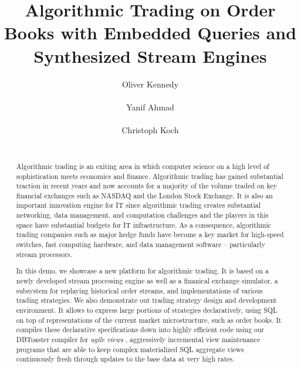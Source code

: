 \documentclass{vldb}
\begin{document}
\title{Algorithmic Trading on Order Books with Embedded Queries and Synthesized
Stream Engines}
\author{
\alignauthor
Oliver Kennedy\\
\\
\alignauthor
Yanif Ahmad\\
\\
\alignauthor
Christoph Koch\\
\\
}
\maketitle

\begin{abstract}
Algorithmic trading is an exiting area in which computer science on a
high level of sophistication meets economics and finance. Algorithmic
trading has gained substantial traction in recent years and now accounts
for a majority of the volume traded on key financial exchanges such as
NASDAQ and the London Stock Exchange. It is also an important innovation
engine for IT since algorithmic trading creates substantial
networking, data management, and computation challenges and
the players in this
space have substantial budgets for IT infrastructure.
As a consequence, algorithmic trading companies such as major hedge funds have
become a key market for high-speed switches, fast computing hardware, and data
management software -- particularly stream processors.

In this demo, we showcase a new platform for algorithmic trading.
It is based on a newly developed stream processing engine
as well as a finanical exchange simulator, a subsystem for replaying
historical order streams, and implementations of various trading strategies.
We also demonstrate out trading strategy design and development environment.
It allows to express large portions of strategies declaratively, using SQL on
top of representations of the current
market microstructure, such as order books.
It compiles these declarative specifications down into highly efficient
code using our DBToaster compiler for {\em agile views} \cite{cidr11},
aggressively incremental view maintenance programs that are able to
keep complex materialized SQL aggregate views continuously fresh through
updates to the base data at very high rates.
\end{abstract}
\end{document}
